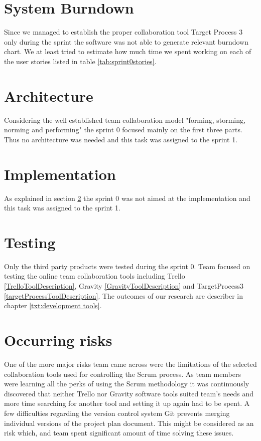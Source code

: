 \section{System Burndown}
Since we managed to establish the proper collaboration tool Target Process 3 only during the sprint the software was not able to generate relevant burndown chart.
We at least tried to estimate how much time we spent working on each of the user stories listed in table \ref{tab:sprint0stories}.

\section{Architecture} \label{txt:sprint0architecture}

Considering the well established team collaboration model "forming, storming, norming and performing" the sprint 0 focused mainly on the first three parts.
Thus no architecture was needed and this task was assigned to the sprint 1.

\section{Implementation}

As explained in section \ref{txt:sprint0architecture} the sprint 0 was not aimed at the implementation and this task was assigned to the sprint 1.

\section{Testing}

Only the third party products were tested during the sprint 0. Team focused on testing the online team collaboration tools including Trello \ref{TrelloToolDescription}, Gravity \ref{GravityToolDescription} and TargetProcess3 \ref{targetProcessToolDescription}. The outcomes of our research are describer in chapter \ref{txt:development tools}.

\section{Occurring risks}

One of the more major risks team came across were the limitations of the selected collaboration tools used for controlling the Scrum process. As team members were learning all the perks of using the Scrum methodology it was continuously discovered that neither Trello nor Gravity software tools suited team's needs and more time searching for another tool and setting it up again had to be spent. A few difficulties regarding the version control system Git prevents merging individual versions of the project plan document. This might be considered as an risk which, and team spent significant amount of time solving these issues.

